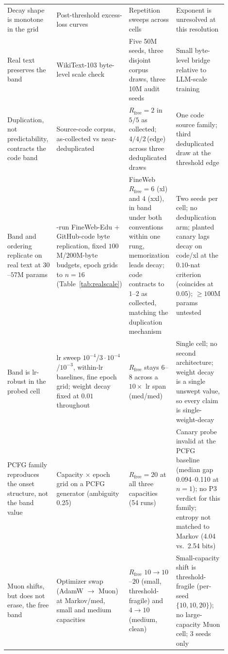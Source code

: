 \documentclass[11pt]{article}
\begin{document}
\begin{table}[htbp]
\begin{tabular}{@{}>{\raggedright\arraybackslash}p{0.23\linewidth}>{\raggedright\arraybackslash}p{0.24\linewidth}>{\raggedright\arraybackslash}p{0.18\linewidth}>{\raggedright\arraybackslash}p{0.25\linewidth}@{}}
Decay shape is monotone in the grid & Post-threshold excess-loss curves & Repetition sweeps across cells & Exponent is unresolved at this resolution \\
Real text preserves the band & WikiText-103 byte-level scale check & Five 50M seeds, three disjoint corpus draws, three 10M audit seeds & Small byte-level bridge relative to LLM-scale training \\
Duplication, not predictability, contracts the code band & Source-code corpus, as-collected vs near-deduplicated & $R_{\mathrm{free}}=2$ in $5/5$ as collected; $4/4/2$\,(edge) across three deduplicated draws & One code source family; third deduplicated draw at the threshold edge \\
Band and ordering replicate on real text at $30$--$57$M params & 48-run FineWeb-Edu $+$ GitHub-code byte replication, fixed $100$M/$200$M-byte budgets, epoch grids to $n{=}16$ (Table~\ref{tab:realscale}) & FineWeb $R_{\mathrm{free}}=6$ (xl) and $4$ (xxl), in band under both conventions within one rung, memorization leads decay; code contracts to $1$--$2$ as collected, matching the duplication mechanism & Two seeds per cell; no deduplication arm; planted canary lags decay on code/xl at the $0.10$-nat criterion (coincides at $0.05$); ${\geq}100$M params untested \\
Band is lr-robust in the probed cell & lr sweep $10^{-4}$/$3{\cdot}10^{-4}$/$10^{-3}$, within-lr baselines, fine epoch grid; weight decay fixed at $0.01$ throughout & $R_{\mathrm{free}}$ stays 6--8 across a $10\times$ lr span (med/med) & Single cell; no second architecture; weight decay is a single unswept value, so every claim is single-weight-decay \\
PCFG family reproduces the onset structure, not the band value & Capacity $\times$ epoch grid on a PCFG generator (ambiguity 0.25) & $R_{\mathrm{free}}=20$ at all three capacities (54 runs) & Canary probe invalid at the PCFG baseline (median gap 0.094--0.110 at $n{=}1$); no P3 verdict for this family; entropy not matched to Markov (4.04 vs.\ 2.54 bits) \\
Muon shifts, but does not erase, the free band & Optimizer swap (AdamW $\to$ Muon) at Markov/med, small and medium capacities & $R_{\mathrm{free}}$ $10\to10$--$20$ (small, threshold-fragile) and $4\to10$ (medium, clean) & Small-capacity shift is threshold-fragile (per-seed $\{10,10,20\}$); no large-capacity Muon cell; 3 seeds only \\
\bottomrule
\end{tabular}
\end{table}
\end{document}
